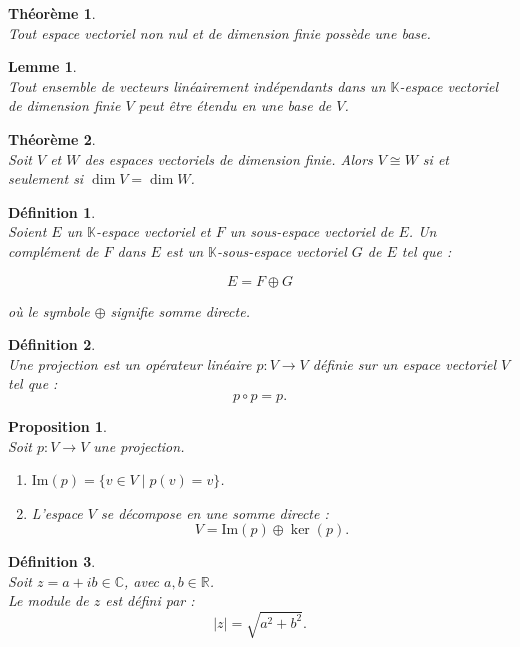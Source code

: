 \documentclass[a4paper, 14pt]{report}
\newtheorem{definition}{Définition}[section]
\newtheorem{proposition}{Proposition}[section]
\newtheorem{theorem}{Théorème}[section]
\newtheorem{lemma}{Lemme}
\begin{document}
\begin{onehalfspace}
{\begin{theorem} \cite{lang2012algebra} \\
Tout espace vectoriel non nul et de dimension finie possède une base.
\end{theorem}

\begin{lemma} \cite{lang2012algebra} \\
Tout ensemble de vecteurs linéairement indépendants dans un \(\mathbb{K}\)-espace vectoriel de dimension finie \( V \) peut être étendu en une base de \( V \).
\end{lemma}

\begin{theorem} \cite{lang2012algebra} \\
Soit \( V \) et \( W \) des espaces vectoriels de dimension finie. Alors \( V \cong W \) si et seulement si \( \dim V = \dim W \).
\end{theorem}

\begin{definition} \cite{lang2012algebra} \\
Soient \( E \) un \(\mathbb{K}\)-espace vectoriel et \( F \) un sous-espace vectoriel de \( E \).  
Un complément de \( F \) dans \( E \) est un \(\mathbb{K}\)-sous-espace vectoriel \( G \) de \( E \) tel que :

\[
E = F \oplus G
\]

où le symbole \( \oplus \) signifie somme directe.
\end{definition}

\begin{definition} \cite{lang2012algebra}\\
Une projection est un opérateur linéaire \( p : V \to V \) définie sur un espace vectoriel \( V \) tel que :
\[
p \circ p = p.
\]
\end{definition}


\begin{proposition} \cite{lang2012algebra}\\
Soit \( p : V \to V \) une projection.
	\begin{enumerate}[label=\roman*)]
		\item \( \mathrm{Im}(p) = \{v \in V \mid p(v) = v\} \).
		\item L'espace \( V \) se décompose en une somme directe :
		\[
		V = \mathrm{Im}(p) \oplus \ker(p).
		\]
	\end{enumerate}
\end{proposition}


\begin{definition} \cite{rudin1976principles} \\
Soit \( z = a + ib \in \mathbb{C} \), avec \( a, b \in \mathbb{R} \). \\
Le module de \( z \) est défini par :
\[
|z| = \sqrt{a^2 + b^2}.
\]
\end{definition}

}
\end{onehalfspace}
\end{document}
